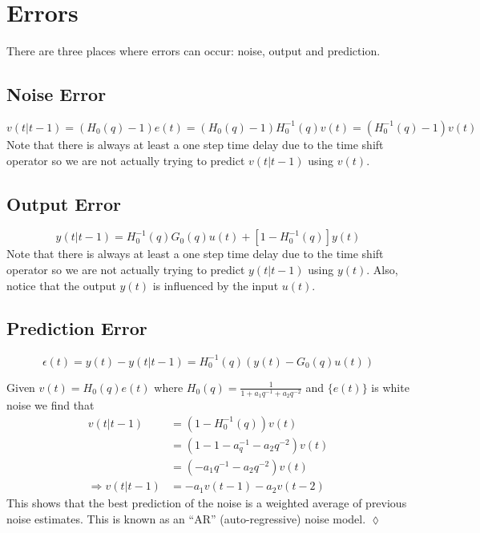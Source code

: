 % 
% 
%
%
% 
\mainmatter
\setcounter{page}{1}

\lectureseries[\course]{\course}

\date{November 3, 2009}

\setaddress

\setcounter{lecture}{11}
\setcounter{chapter}{11}


\section{Errors}
There are three places where errors can occur: noise, output and prediction.

\subsection{Noise Error}
$$v(t|t-1) = (H_0(q)-1)e(t) = (H_0(q)-1)H_0^{-1}(q)v(t) = (H_0^{-1}(q)-1)v(t)$$
Note that there is always at least a one step time delay due to the time shift operator so we are not actually trying to predict $v(t|t-1)$ using $v(t)$.

\subsection{Output Error}
$$y(t|t-1) = H_0^{-1}(q)G_0(q)u(t) + [1-H_0^{-1}(q)]y(t)$$
Note that there is always at least a one step time delay due to the time shift operator so we are not actually trying to predict $y(t|t-1)$ using $y(t)$. Also, notice that the output $y(t)$ is influenced by the input $u(t)$.

\subsection{Prediction Error}
$$\epsilon(t) = y(t) - y(t|t-1) = H_0^{-1}(q)(y(t)-G_0(q)u(t))$$

\begin{example}
Given $v(t) = H_0(q)e(t)$ where $H_0(q) = \frac{1}{1+a_1q^{-1}+a_2q^{-2}}$ and $\{e(t)\}$ is white noise we find that
\begin{align*}
v(t|t-1) &= (1-H_0^{-1}(q))v(t) \\
&= (1-1-a_q^{-1}-a_2q^{-2})v(t) \\
&= (-a_1q^{-1}-a_2q^{-2})v(t) \\
\Rightarrow v(t|t-1) &= -a_1v(t-1)-a_2v(t-2)
\end{align*}
This shows that the best prediction of the noise is a weighted average of previous noise estimates. This is known as an ``AR'' (auto-regressive) noise model.
$\lozenge$
\end{example}


